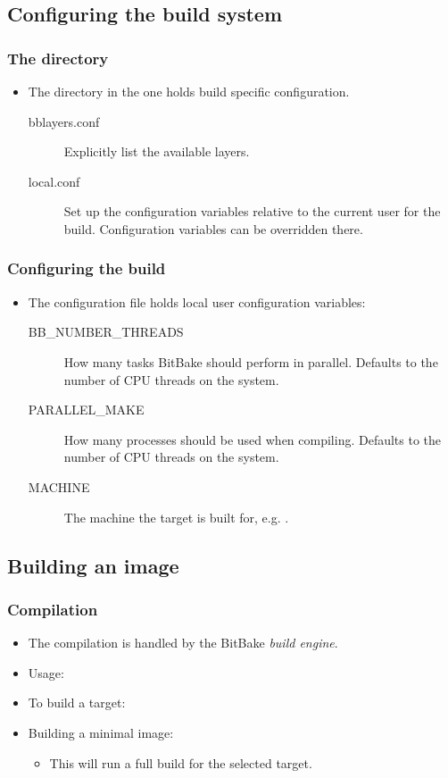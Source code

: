 \subsection{Configuring the build system}

\begin{frame}
  \frametitle{The  directory}
  \begin{itemize}
    \item The  directory in the  one holds
      build specific configuration.
    \begin{description}
      \item[bblayers.conf] Explicitly list the available layers.
      \item[local.conf] Set up the configuration variables relative to
        the current user for the build. Configuration variables can be
        overridden there.
    \end{description}
  \end{itemize}
\end{frame}

\begin{frame}
  \frametitle{Configuring the build}
  \begin{itemize}
    \item The  configuration file holds local
    user configuration variables:
    \begin{description}
      \item[BB\_NUMBER\_THREADS] How many tasks BitBake should perform
        in parallel. Defaults to the number of CPU threads on the system.
      \item[PARALLEL\_MAKE] How many processes should be used when
        compiling. Defaults to the number of CPU threads on the system.
      \item[MACHINE] The machine the target is built for, e.g.
        .
    \end{description}
  \end{itemize}
\end{frame}

\subsection{Building an image}

\begin{frame}
  \frametitle{Compilation}
  \begin{itemize}
    \item The compilation is handled by the BitBake {\em build
      engine}.
    \item Usage: 
    \item To build a target: 
    \item Building a minimal image: 
    \begin{itemize}
      \item This will run a full build for the selected target.
    \end{itemize}
  \end{itemize}
\end{frame}
